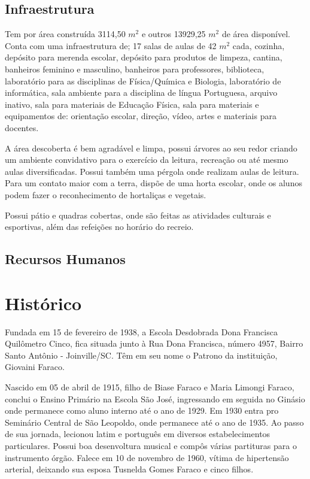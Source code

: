 \subsection{Infraestrutura}
Tem por área construída 3114,50 $m^2$ e outros 13929,25 $m^2$ de área disponível. Conta com uma infraestrutura de; 17 salas de aulas  de 42 $m^2$ cada, cozinha, depósito para merenda escolar, depósito para produtos de limpeza, cantina, banheiros feminino e masculino, banheiros para professores, biblioteca, laboratório para as disciplinas de Física/Química e Biologia, laboratório de informática, sala ambiente para a disciplina de língua Portuguesa, arquivo inativo, sala para materiais de Educação Física, sala para materiais e equipamentos de: orientação escolar, direção, vídeo, artes e materiais para docentes.

A área descoberta é bem agradável e limpa, possui árvores ao seu redor criando um ambiente convidativo para o exercício da leitura, recreação ou até mesmo aulas diversificadas. Possui também uma pérgola onde realizam aulas de leitura. Para um contato maior com a terra, dispõe de uma horta escolar, onde os alunos podem fazer o reconhecimento de hortaliças e vegetais.

Possui pátio e quadras cobertas, onde são feitas as atividades culturais e esportivas, além das refeições no horário do recreio.

\subsection{Recursos Humanos}


\section{Histórico}
Fundada em 15 de fevereiro de 1938, a Escola Desdobrada Dona Francisca Quilômetro Cinco, fica situada junto à Rua Dona Francisca, número 4957, Bairro Santo Antônio -  Joinville/SC. Têm em seu nome o Patrono da instituição, Giovaini Faraco.

Nascido em 05 de abril de 1915, filho de Biase Faraco e Maria Limongi Faraco, conclui o Ensino Primário na Escola São José, ingressando em seguida no Ginásio onde permanece como aluno interno até o ano de 1929. Em 1930 entra pro Seminário Central de São Leopoldo, onde permanece até o ano de 1935. Ao passo de sua jornada, lecionou latim e português em diversos estabelecimentos particulares. Possui boa desenvoltura musical e compôs várias partituras para o instrumento órgão. Falece em 10 de novembro de 1960, vítima de hipertensão arterial, deixando sua esposa Tusnelda Gomes Faraco e cinco filhos.

